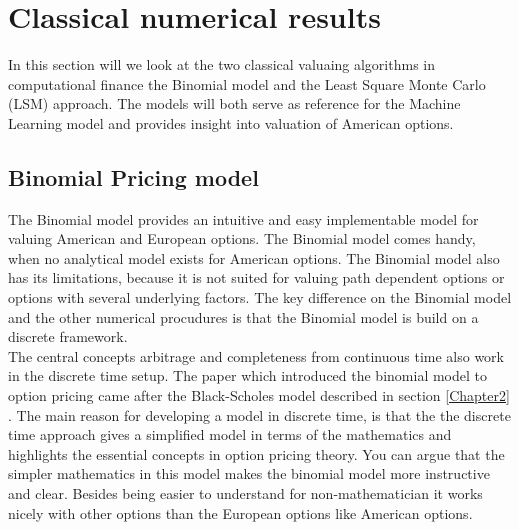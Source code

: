 
\chapter{Classical numerical results} %

\label{Chapter3} %



In this section will we look at the two classical valuaing algorithms in computational finance the Binomial model and the Least Square Monte Carlo (LSM) approach. The models will both serve as reference for the Machine Learning model and provides insight into valuation of American options.


\section{Binomial Pricing model}
The Binomial model provides an intuitive and easy implementable model for valuing American and European options. The Binomial model comes handy, when no analytical model exists for American options. The Binomial model also has its limitations, because it is not suited for valuing path dependent options or options with several underlying factors. The key difference on the Binomial model and the other numerical procudures is that the Binomial model is build on a discrete framework. \\

The central concepts arbitrage and completeness from continuous time also work in the discrete time setup. The paper \parencite{binomial-Paper} which introduced the binomial model to option pricing came after the Black-Scholes model described in section \ref{Chapter2} \parencite{B-S-Paper}. The main reason for developing a model in discrete time, is that the the discrete time approach gives a simplified model in terms of the mathematics and highlights the essential concepts in option pricing theory. You can argue that the simpler mathematics in this model makes the binomial model more instructive and clear. Besides being easier to understand for non-mathematician it works nicely with other options than the European options like American options.\\

